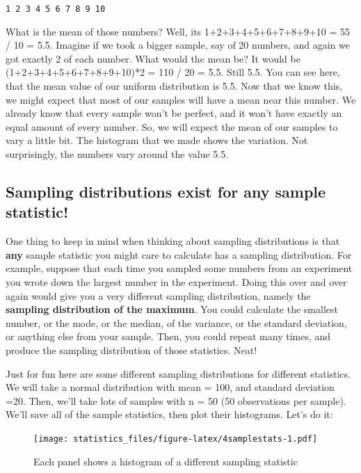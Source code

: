 \documentclass[]{book}
\begin{document}
\texttt{1\ 2\ 3\ 4\ 5\ 6\ 7\ 8\ 9\ 10}

What is the mean of those numbers? Well, its 1+2+3+4+5+6+7+8+9+10 = 55 / 10 = 5.5. Imagine if we took a bigger sample, say of 20 numbers, and again we got exactly 2 of each number. What would the mean be? It would be (1+2+3+4+5+6+7+8+9+10)*2 = 110 / 20 = 5.5. Still 5.5. You can see here, that the mean value of our uniform distribution is 5.5. Now that we know this, we might expect that most of our samples will have a mean near this number. We already know that every sample won't be perfect, and it won't have exactly an equal amount of every number. So, we will expect the mean of our samples to vary a little bit. The histogram that we made shows the variation. Not surprisingly, the numbers vary around the value 5.5.

\hypertarget{sampling-distributions-exist-for-any-sample-statistic}{%
\subsection{Sampling distributions exist for any sample statistic!}\label{sampling-distributions-exist-for-any-sample-statistic}}

One thing to keep in mind when thinking about sampling distributions is that \textbf{any} sample statistic you might care to calculate has a sampling distribution. For example, suppose that each time you sampled some numbers from an experiment you wrote down the largest number in the experiment. Doing this over and over again would give you a very different sampling distribution, namely the \textbf{sampling distribution of the maximum}. You could calculate the smallest number, or the mode, or the median, of the variance, or the standard deviation, or anything else from your sample. Then, you could repeat many times, and produce the sampling distribution of those statistics. Neat!

Just for fun here are some different sampling distributions for different statistics. We will take a normal distribution with mean = 100, and standard deviation =20. Then, we'll take lots of samples with n = 50 (50 observations per sample). We'll save all of the sample statistics, then plot their histograms. Let's do it:

\begin{figure}
\centering
\texttt{[image: statistics\_files/figure-latex/4samplestats-1.pdf]}
\caption{\label{fig:4samplestats}Each panel shows a histogram of a different sampling statistic}
\end{figure}
\end{document}
